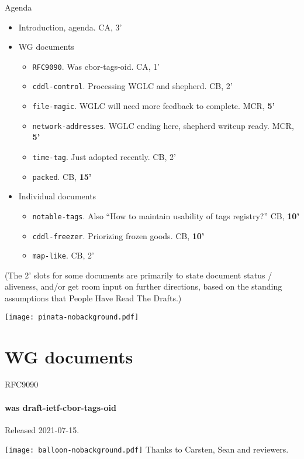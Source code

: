 \documentclass[aspectratio=169]{beamer}
\begin{document}
\begin{frame}{Agenda}\large
	\begin{itemize}
		\item Introduction, agenda. CA, 3’

		\item WG documents
			\begin{itemize}
				\item \texttt{RFC9090}. Was cbor-tags-oid. CA, 1’
				\item \texttt{cddl-control}. Processing WGLC and shepherd. CB, 2’
				\item \texttt{file-magic}. WGLC will need more feedback to complete. MCR, \textbf{5’}
				\item \texttt{network-addresses}. WGLC ending here, shepherd writeup ready. MCR, \textbf{5’}
				\item \texttt{time-tag}. Just adopted recently. CB, 2’
				\item \texttt{packed}. CB, \textbf{15’}
			\end{itemize}

			\item Individual documents
			\begin{itemize}
				\item \texttt{notable-tags}. Also ``How to maintain usability of tags registry?'' CB, \textbf{10’}
				\item \texttt{cddl-freezer}. Priorizing frozen goods. CB, \textbf{10’}
				\item \texttt{map-like}. CB, 2’
			\end{itemize}
	\end{itemize}

	\small (The 2’ slots for some documents are primarily to state document status / aliveness, and/or get room input on further directions, based on the standing assumptions that People Have Read The Drafts.)

	\vspace{-3cm}
	\begin{block}{\texttt{[image: pinata-nobackground.pdf]}\mbox{\quad}}
	\end{block}
\end{frame}

\section*{WG documents}

\begin{frame}{RFC9090}\Large
	\framesubtitle{was draft-ietf-cbor-tags-oid}

	Released 2021-07-15.

	\begin{block}{\texttt{[image: balloon-nobackground.pdf]}\mbox{\quad}}
		Thanks to Carsten, Sean and reviewers.
	\end{block}
\end{frame}
\end{document}
